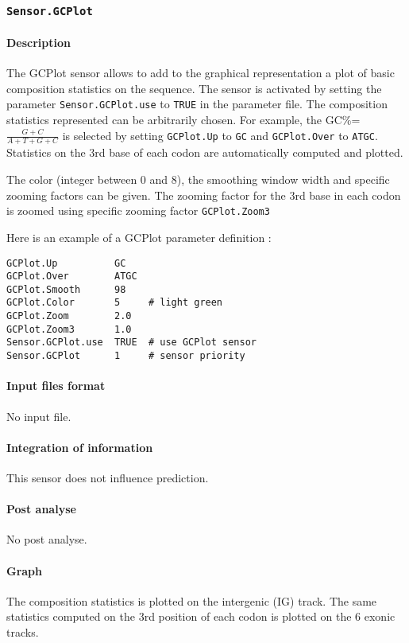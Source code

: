 
\subsubsection{\texttt{Sensor.GCPlot}}

\paragraph{Description}

The GCPlot sensor allows to add to the graphical representation a plot
of basic composition statistics on the sequence. The sensor is
activated by setting the parameter \texttt{Sensor.GCPlot.use} to
\texttt{TRUE} in the parameter file. The composition statistics
represented can be arbitrarily chosen. For example, the
GC\%=$\frac{G+C}{A+T+G+C}$ is selected by setting \texttt{GCPlot.Up}
to \texttt{GC} and \texttt{GCPlot.Over} to \texttt{ATGC}. Statistics
on the 3rd base of each codon are automatically computed and plotted.

The color (integer between 0 and 8), the smoothing window width and
specific zooming factors can be given. The zooming factor for the 3rd base
in each codon is zoomed using specific zooming factor
\texttt{GCPlot.Zoom3}

Here is an example of a GCPlot parameter definition :
\begin{Verbatim}[fontsize=\small]
GCPlot.Up          GC
GCPlot.Over        ATGC
GCPlot.Smooth      98
GCPlot.Color       5     # light green
GCPlot.Zoom        2.0
GCPlot.Zoom3       1.0
Sensor.GCPlot.use  TRUE  # use GCPlot sensor
Sensor.GCPlot      1     # sensor priority
\end{Verbatim}

\paragraph{Input files format}

No input file.

\paragraph{Integration of information}

This sensor does not influence prediction.

\paragraph{Post analyse}

No post analyse.

\paragraph{Graph}

The composition statistics is plotted on the intergenic (IG) track.
The same statistics computed on the 3rd position of each codon is
plotted on the 6 exonic tracks.

